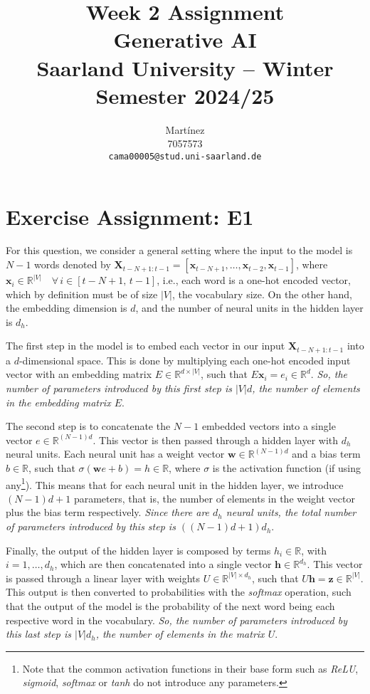 \documentclass{article}
\title{Week 2 Assignment\\
\vspace{2mm}
\small{Generative AI}
\\
\vspace{2mm}
\small{Saarland University -- Winter Semester 2024/25}
}
\author{%
  Martínez \\
  7057573 \\
  \texttt{cama00005@stud.uni-saarland.de} \\
}
\begin{document}
\maketitle

\section{Exercise Assignment: E1}\label{sec:e1}
For this question, we consider a general setting where the input to the model is $N - 1$ words denoted by $\mathbf{X}_{t-N+1:t-1} = \left[\mathbf{x}_{t - N + 1}, \dots, \mathbf{x}_{t - 2}, \mathbf{x}_{t - 1}\right]$, where $\mathbf{x}_{i} \in \mathbb{R}^{|V|} \quad \forall \, i \in [t-N+1, \, t-1]$, i.e., each word is a one-hot encoded vector, which by definition must be of size $|V|$, the vocabulary size. On the other hand, the embedding dimension is $d$, and the number of neural units in the hidden layer is $d_h$.

The first step in the model is to embed each vector in our input $\mathbf{X}_{t-N+1:t-1}$ into a $d$-dimensional space. This is done by multiplying each one-hot encoded input vector with an embedding matrix $E \in \mathbb{R}^{d \times |V|}$, such that $E \mathbf{x}_{i} = e_i \in \mathbb{R}^d$. \textit{So, the number of parameters introduced by this first step is $|V|d$, the number of elements in the embedding matrix $E$}.

The second step is to concatenate the $N - 1$ embedded vectors into a single vector $e \in \mathbb{R}^{(N - 1)d}$. This vector is then passed through a hidden layer with $d_h$ neural units. Each neural unit has a weight vector $\mathbf{w} \in \mathbb{R}^{(N - 1)d}$ and a bias term $b \in \mathbb{R}$, such that $\sigma(\mathbf{w}e + b) = h \in \mathbb{R}$, where $\sigma$ is the activation function (if using any\footnote{Note that the common activation functions in their base form such as \textit{ReLU}, \textit{sigmoid}, \textit{softmax} or \textit{tanh} do not introduce any parameters.}). This means that for each neural unit in the hidden layer, we introduce $(N - 1)d + 1$ parameters, that is, the number of elements in the weight vector plus the bias term respectively. \textit{Since there are $d_h$ neural units, the total number of parameters introduced by this step is $\left((N - 1)d + 1\right)d_h$}.

Finally, the output of the hidden layer is composed by terms $h_i \in \mathbb{R}$, with $i = 1,\dots,d_h$, which are then concatenated into a single vector $\mathbf{h} \in \mathbb{R}^{d_h}$. This vector is passed through a linear layer with weights $U \in \mathbb{R}^{|V| \times d_h}$, such that $U\mathbf{h} = \mathbf{z} \in \mathbb{R}^{|V|}$. This output is then converted to probabilities with the \textit{softmax} operation, such that the output of the model is the probability of the next word being each respective word in the vocabulary. \textit{So, the number of parameters introduced by this last step is $|V|d_h$, the number of elements in the matrix $U$}.
\end{document}

